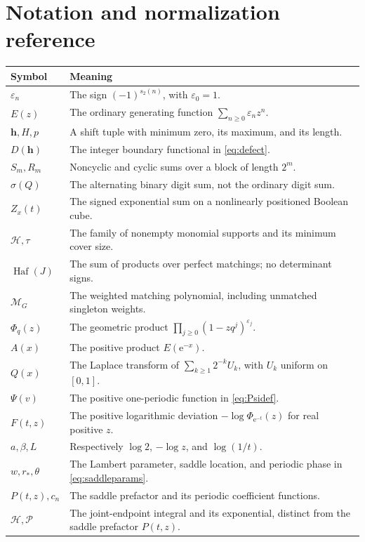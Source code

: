 \documentclass[11pt,oneside]{article}
\numberwithin{equation}{section}
\theoremstyle{definition}
\theoremstyle{remark}
\newcommand{\eps}{\varepsilon}
\newcommand{\HH}{\mathcal H}
\newcommand{\MM}{\mathcal M}
\newcommand{\e}{\mathrm e}
\DeclareMathOperator{\Haf}{Haf}
\begin{document}
\section{Notation and normalization reference}
\begin{longtable}{@{}p{}p{}@{}}
\toprule
Symbol&Meaning\\
\midrule
\endhead
\(\eps_n\)&The sign \((-1)^{s_2(n)}\), with \(\eps_0=1\).\\[2mm]
\(E(z)\)&The ordinary generating function \(\sum_{n\ge0}\eps_nz^n\).\\[2mm]
\(\bm h,H,p\)&A shift tuple with minimum zero, its maximum, and its length.\\[2mm]
\(D(\bm h)\)&The integer boundary functional in \eqref{eq:defect}.\\[2mm]
\(S_m,R_m\)&Noncyclic and cyclic sums over a block of length \(2^m\).\\[2mm]
\(\sigma(Q)\)&The alternating binary digit sum, not the ordinary digit sum.\\[2mm]
\(Z_x(t)\)&The signed exponential sum on a nonlinearly positioned Boolean cube.\\[2mm]
\(\HH,\tau\)&The family of nonempty monomial supports and its minimum cover size.\\[2mm]
\(\Haf(J)\)&The sum of products over perfect matchings; no determinant signs.\\[2mm]
\(\MM_G\)&The weighted matching polynomial, including unmatched singleton weights.\\[2mm]
\(\Phi_q(z)\)&The geometric product \(\prod_{j\ge0}(1-zq^j)^{\eps_j}\).\\[2mm]
\(A(x)\)&The positive product \(E(\e^{-x})\).\\[2mm]
\(Q(x)\)&The Laplace transform of \(\sum_{k\ge1}2^{-k}U_k\), with \(U_k\) uniform on \([0,1]\).\\[2mm]
\(\Psi(v)\)&The positive one-periodic function in \eqref{eq:Psidef}.\\[2mm]
\(F(t,z)\)&The positive logarithmic deviation \(-\log\Phi_{\e^{-t}}(z)\) for real positive \(z\).\\[2mm]
\(a,\beta,L\)&Respectively \(\log2\), \(-\log z\), and \(\log(1/t)\).\\[2mm]
\(w,r_*,\theta\)&The Lambert parameter, saddle location, and periodic phase in \eqref{eq:saddleparams}.\\[2mm]
\(P(t,z),c_n\)&The saddle prefactor and its periodic coefficient functions.\\[2mm]
\(\mathcal H,\mathcal P\)&The joint-endpoint integral and its exponential, distinct from the saddle prefactor \(P(t,z)\).\\
\bottomrule
\end{longtable}
\end{document}
